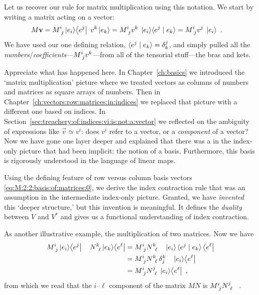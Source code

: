\documentclass[12pt, oneside]{report}    %
\begin{document}
Let us recover our rule for matrix multiplication using this notation. We start by writing a matrix acting on a vector:
\begin{align}
    M\vec{v} &= 
    M\aij{i}{j}\ket{e_i}\!\bra{e^j}\; 
    v^k\ket{e_k}
    =
    M\aij{i}{j} 
    v^k\; 
    \ket{e_i}\!\la{e^j} \mid {e_k} \ra
    =
    M\aij{i}{j} 
    v^j\; \ket{e_i} \ .
\end{align}
We have used our one defining relation, $\langle{e^j} \mid {e_k} \rangle = \delta^j_k$, and simply pulled all the \emph{numbers}/\emph{coefficients}---$M\aij{i}{j} v^k$---from all of the tensorial stuff---the bras and kets. 

\begin{bigidea}
Appreciate what has happened here. In Chapter~\ref{ch:basics} we introduced the `matrix multiplication' picture where we treated vectors as columns of numbers and matrices as square arrays of numbers. Then in Chapter~\ref{ch:vectors:row:matrices:in:indices} we replaced that picture with a different one based on indices. In Section~\ref{sec:treachery:of:indices:vi:is:not:a:vector} we reflected on the ambiguity of expressions like $\vec{v}\simeq v^i$: does $v^i$ refer to a vector, or a \emph{component} of a vector? Now we have gone one layer deeper and explained that there was a in the index-only picture that had been implicit: the notion of a basis. Furthermore, this basis is rigorously understood in the language of linear maps. 

Using the defining feature of row versus column basis vectors \eqref{eq:M:2:2:basis:of:matrices:0}, we derive the index contraction rule that was an assumption in the intermediate index-only picture. Granted, we have \emph{invented} this `deeper structure,' but this invention is meaningful. It defines the \emph{duality} between $V$ and $V^*$ and gives us a functional understanding of index contraction.
\end{bigidea}

As another illustrative example, the multiplication of two matrices. Now we have
\begin{align}
    M\aij{i}{j} \ket{e_i}\! \bra{e^j} \quad N\aij{k}{\ell}  \ket{e_k}\!\bra{e^\ell}
    &=
    M\aij{i}{j} N\aij{k}{\ell} \quad \ket{e_i} \la{e^j} \mid {e_k}\ra \bra{e^\ell}
    \\&=
    M\aij{i}{j} N\aij{k}{\ell}\, \delta^k_j \quad \ket{e_i}\!\bra{e^\ell} 
    \\&=
    M\aij{i}{j} N\aij{j}{\ell} \; \ket{e_i}\!\bra{e^\ell} \ ,
\end{align}
from which we read that the $i$--$\ell$ component of the matrix $MN$ is $ M\aij{i}{j} N\aij{j}{\ell}$ \ .
\end{document}
